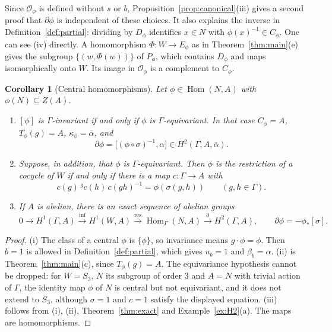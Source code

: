\documentclass[12pt,letterpaper]{article}
\numberwithin{equation}{section}
\theoremstyle{plain}
\newtheorem{corollary}[theorem]{Corollary}
\theoremstyle{definition}
\newcommand{\act}[2]{{}^{#1}\!#2}          %
\DeclareMathOperator{\Hom}{Hom}
\DeclareMathOperator{\infl}{inf}
\DeclareMathOperator{\res}{res}
\begin{document}
Since $\mathcal{O}_\phi$ is defined without $s$ or $b$,
Proposition~\ref{prop:canonical}(iii) gives a second proof that
$\partial\phi$ is independent of these choices. It also explains the
inverse in Definition~\ref{def:partial}: dividing by $D_\phi$ identifies
$x\in N$ with $\phi(x)^{-1}\in C_\phi$. One can see (iv) directly. A
homomorphism $\Phi:W\to E_\phi$ as in Theorem~\ref{thm:main}(e) gives the
subgroup $\{(w,\Phi(w))\}$ of $P_\phi$, which contains $D_\phi$ and maps
isomorphically onto $W$. Its image in $\mathcal{O}_\phi$ is a complement
to $C_\phi$.


\begin{corollary}[Central homomorphisms]\label{cor:central}
Let $\phi\in\Hom(N,A)$ with $\phi(N)\subseteq Z(A)$.
\begin{enumerate}[label=\textup{(\roman*)},itemsep=1pt]
\item $[\phi]$ is $\Gamma$-invariant if and only if $\phi$ is
$\Gamma$-equivariant. In that case $C_\phi=A$, $T_\phi(g)=A$,
$\kappa_\phi=\overline{\alpha}$, and
\[
\partial\phi=\bigl[(\phi\circ\sigma)^{-1},\alpha\bigr]\in
H^2(\Gamma,A,\overline{\alpha}).
\]
\item Suppose, in addition, that $\phi$ is $\Gamma$-equivariant. Then
$\phi$ is the restriction of a cocycle of $W$ if and only if there is a
map $c:\Gamma\to A$ with
\[
c(g)\,\act{g}{c(h)}\,c(gh)^{-1}=\phi(\sigma(g,h))\qquad(g,h\in\Gamma).
\]
\item If $A$ is abelian, there is an exact sequence of abelian groups
\[
0\to H^1(\Gamma,A)\overset{\infl}{\longrightarrow}H^1(W,A)
\overset{\res}{\longrightarrow}\Hom_\Gamma(N,A)
\overset{\partial}{\longrightarrow}H^2(\Gamma,A),\qquad
\partial\phi=-\phi_*[\sigma].
\]
\end{enumerate}
\end{corollary}

\begin{proof}
(i) The class of a central $\phi$ is $\{\phi\}$, so invariance means
$g\cdot\phi=\phi$. Then $b=1$ is allowed in Definition~\ref{def:partial},
which gives $u_b=1$ and $\beta_b=\alpha$. (ii) is
Theorem~\ref{thm:main}(c), since $T_\phi(g)=A$. The equivariance
hypothesis cannot be dropped: for $W=S_3$, $N$ its subgroup of order $3$
and $A=N$ with trivial action of $\Gamma$, the identity map $\phi$ of $N$
is central but not equivariant, and it does not extend to $S_3$, although
$\sigma=1$ and $c=1$ satisfy the displayed equation. (iii) follows from (i), (ii),
Theorem~\ref{thm:exact} and Example~\ref{ex:H2}(a). The maps are
homomorphisms.
\end{proof}
\end{document}
